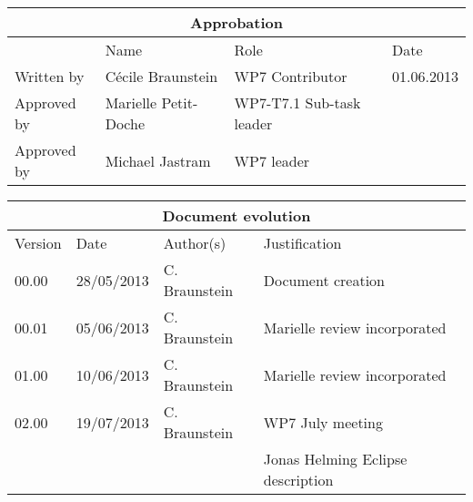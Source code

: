 \documentclass{openetcs_report}
\begin{document}
\begin{tabular}{|p{2.2cm}|p{4cm}|p{4cm}|p{2cm}|}
\hline
\multicolumn{4}{|c|}{Approbation} \\
\hline
  &  Name & Role & Date   \\
\hline  
Written by    &  C\'ecile Braunstein & WP7 Contributor  & 01.06.2013 \\
\hline
Approved by & Marielle Petit-Doche & WP7-T7.1 Sub-task  leader & \\
\hline
Approved by & Michael Jastram & WP7 leader & \\
\hline
\end{tabular}

\begin{tabular}{|p{2.2cm}|p{2cm}|p{3cm}|p{5cm}|}
\hline
\multicolumn{4}{|c|}{Document evolution} \\
\hline
Version &  Date & Author(s) & Justification  \\
\hline  
00.00 & 28/05/2013 & C. Braunstein &  Document creation  \\
00.01 & 05/06/2013 & C. Braunstein &  Marielle review incorporated  \\
01.00 & 10/06/2013 & C. Braunstein &  Marielle review incorporated  \\
02.00 & 19/07/2013 & C. Braunstein &  WP7 July meeting \\
      &            &               & Jonas Helming Eclipse description\\
\hline  

\end{tabular}



\newcommand{\tbd}{\colorbox{cyan}{\%\%To Be Defined\%\%}}
\newcommand{\tbc}{\colorbox{cyan}{\%\%To Be Confirmed\%\%}}
\newcommand{\todo}[1]{\colorbox{cyan}{\%\%{#1}\%\%}}
\newlength{\origindent}

\newenvironment{issue}{
        \begin{quote}
        \begin{itshape}Open Issue.
}{
        \end{itshape}
        \end{quote}
}

\newenvironment{comment}{
        \begin{quote}
        \begin{itshape}Comment.
}{
        \end{itshape}
        \end{quote}
}
\end{document}
